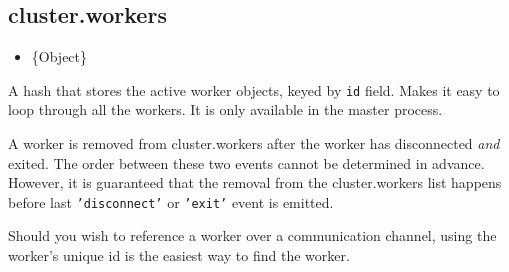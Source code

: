 \subsection{cluster.workers}\label{cluster.workers}

\begin{itemize}
\itemsep1pt\parskip0pt
\item
  \{Object\}
\end{itemize}

A hash that stores the active worker objects, keyed by \texttt{id}
field. Makes it easy to loop through all the workers. It is only
available in the master process.

A worker is removed from cluster.workers after the worker has
disconnected \emph{and} exited. The order between these two events
cannot be determined in advance. However, it is guaranteed that the
removal from the cluster.workers list happens before last
\texttt{'disconnect'} or \texttt{'exit'} event is emitted.

\begin{Shaded}
\begin{Highlighting}[]
 
   \NormalTok{(}  \NormalTok{) \{}
    \NormalTok{(}\NormalTok{[id]);}
  \NormalTok{\}}
\NormalTok{\}}
\NormalTok{(}
  \NormalTok{(}\NormalTok{);}
\NormalTok{\});}
\end{Highlighting}
\end{Shaded}

Should you wish to reference a worker over a communication channel,
using the worker's unique id is the easiest way to find the worker.

\begin{Shaded}
\begin{Highlighting}[]
\NormalTok{(}\NormalTok{, }
   \NormalTok{[id];}
\NormalTok{\});}
\end{Highlighting}
\end{Shaded}

